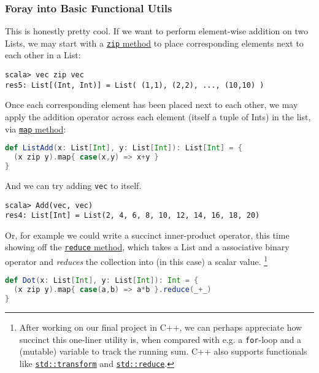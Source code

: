\documentclass[12pt,letterpaper,twoside]{article}
\begin{document}
\subsubsection{Foray into Basic Functional Utils}
This is honestly pretty cool. If we want to perform element-wise addition on two
Lists, we may start with a \href{https://www.scala-lang.org/api/2.12.0/scala/collection/immutable/List.html#zip[B](that:scala.collection.GenIterable[B]):List[(A,B)]}{\texttt{zip} method} to place corresponding elements
next to each other in a List:
\begin{verbatim}
scala> vec zip vec
res5: List[(Int, Int)] = List( (1,1), (2,2), ..., (10,10) ) 
\end{verbatim}
Once each corresponding element has been placed next to each other, we may apply the 
addition operator across each element (itself a tuple of Ints) in the list, via 
\href{https://www.scala-lang.org/api/2.12.0/scala/collection/immutable/List.html#map[B](f:A=%3EB):List[B]}{\texttt{map} method}:
\begin{lstlisting}[language=Scala]
def ListAdd(x: List[Int], y: List[Int]): List[Int] = {
  (x zip y).map{ case(x,y) => x+y }
}
\end{lstlisting}
And we can try adding \texttt{vec} to itself.
\begin{verbatim}
scala> Add(vec, vec)
res4: List[Int] = List(2, 4, 6, 8, 10, 12, 14, 16, 18, 20) 
\end{verbatim}

Or, for example we could write a succinct inner-product operator, this time showing
off the \href{https://www.scala-lang.org/api/2.12.0/scala/collection/immutable/List.html#reduce[A1%3E:A](op:(A1,A1)=%3EA1):A1}{\texttt{reduce} method}, which takes a List and a
associative binary operator and \emph{reduces} the collection into (in this case) a
scalar value. \footnote{
  After working on our final project in C++, we can perhaps appreciate how succinct 
  this 
  one-liner utility is, when compared with e.g. a \texttt{for}-loop and a (mutable) 
  variable
  to track the running sum. C++ also supports
  functionals like 
  \href{https://en.cppreference.com/w/cpp/algorithm/transform}{\texttt{std::transform}}
  and \href{https://en.cppreference.com/w/cpp/algorithm/reduce}{\texttt{std::reduce}}.}
\begin{lstlisting}[language=Scala]
def Dot(x: List[Int], y: List[Int]): Int = {
  (x zip y).map{ case(a,b) => a*b }.reduce(_+_)
} 
\end{lstlisting}
\end{document}
